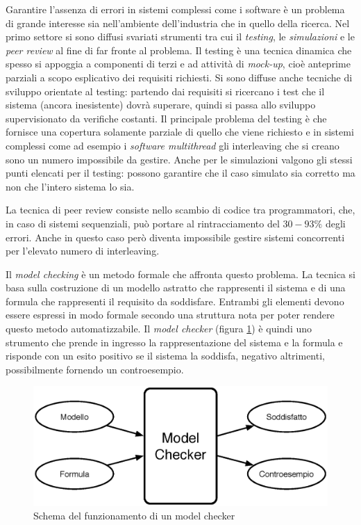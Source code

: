 
Garantire l'assenza di errori in sistemi complessi come i software è un problema di grande interesse sia nell'ambiente dell'industria che in quello della ricerca. Nel primo settore si sono diffusi svariati strumenti tra cui il \emph{testing}, le \emph{simulazioni} e le \emph{peer review} al fine di far fronte al problema. Il testing è una tecnica dinamica che spesso si appoggia a componenti di terzi e ad attività di \emph{mock-up}, cioè anteprime parziali a scopo esplicativo dei requisiti richiesti. Si sono diffuse anche tecniche di sviluppo orientate al testing: partendo dai requisiti si ricercano i test che il sistema (ancora inesistente) dovrà superare, quindi si passa allo sviluppo supervisionato da verifiche costanti. Il principale problema del testing è che fornisce una copertura solamente parziale di quello che viene richiesto e in sistemi complessi come ad esempio i \emph{software multithread} gli interleaving che si creano sono un numero impossibile da gestire. Anche per le simulazioni valgono gli stessi punti elencati per il testing: possono garantire che il caso simulato sia corretto ma non che l'intero sistema lo sia.

La tecnica di peer review consiste nello scambio di codice tra programmatori, che, in caso di sistemi sequenziali, può portare al rintracciamento del $30-93\%$ degli errori. Anche in questo caso però diventa impossibile gestire sistemi concorrenti per l'elevato numero di interleaving.

Il \emph{model checking} è un metodo formale che affronta questo problema. La tecnica si basa sulla costruzione di un modello astratto che rappresenti il sistema e di una formula che rappresenti il requisito da soddisfare. Entrambi gli elementi devono essere espressi in modo formale secondo una struttura nota per poter rendere questo metodo automatizzabile. Il \emph{model checker} (figura \ref{fig:modelchecker}) è quindi uno strumento che prende in ingresso la rappresentazione del sistema e la formula e risponde con un esito positivo se il sistema la soddisfa, negativo altrimenti, possibilmente fornendo un controesempio.
\begin{figure}[htb]
	\begin{center}
		\includegraphics[width=.8\textwidth]{Images/mc.eps}
	\end{center}
\caption{Schema del funzionamento di un model checker}
\label{fig:modelchecker}
\end{figure}

